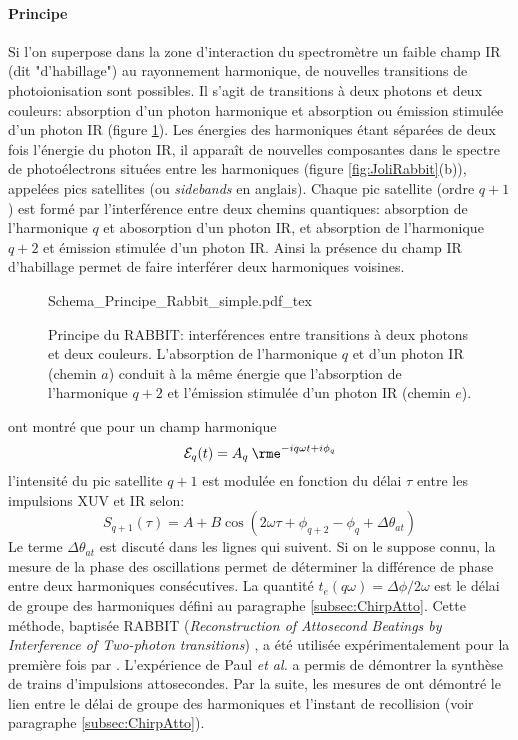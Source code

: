 \paragraph{Principe} Si l'on superpose dans la zone d'interaction du spectromètre un faible champ IR (dit "d'habillage") au rayonnement harmonique, de nouvelles transitions de photoionisation sont possibles. Il s'agit de transitions à deux photons et deux couleurs: absorption d'un photon harmonique et absorption ou émission stimulée d'un photon IR (figure \ref{fig:PrincipeRabbit2}). Les énergies des harmoniques étant séparées de deux fois l'énergie du photon IR, il apparaît de nouvelles composantes dans le spectre de photoélectrons situées entre les harmoniques (figure \ref{fig:JoliRabbit}(b)), appelées pics satellites (ou \textit{sidebands} en anglais). Chaque pic satellite (ordre $q+1$) est formé par l'interférence entre deux chemins quantiques: absorption de l'harmonique $q$ et abosorption d'un photon IR, et absorption de l'harmonique $q+2$ et émission stimulée d'un photon IR. Ainsi la présence du champ IR d'habillage permet de faire interférer deux harmoniques voisines.

\begin{figure}[ht]
\centering
\def\svgwidth{0.5\columnwidth}
{Schema_Principe_Rabbit_simple.pdf_tex}
\caption{Principe du RABBIT: interférences entre transitions à deux photons et deux couleurs. L'absorption de l'harmonique $q$ et d'un photon IR (chemin $a$) conduit à la même énergie que l'absorption de l'harmonique $q+2$ et l'émission stimulée d'un photon IR (chemin $e$).}
\label{fig:PrincipeRabbit2}
\end{figure}

  ont montré que  pour un champ harmonique
\begin{equation}
\mathcal{E}_q(t) = A_q \: \rme^{-iq\omega t + i\phi_q}
\end{equation}
l'intensité du pic satellite $q+1$ est modulée en fonction du délai $\tau$ entre les impulsions XUV et IR selon:
\begin{equation}
S_{q+1}(\tau) = A + B \cos(2\omega \tau + \phi_{q+2} - \phi_q + \Delta \theta_{at})
\label{eq:Rabbit_simple}
\end{equation}
Le terme $\Delta \theta_{at}$ est discuté dans les lignes qui suivent. Si on le suppose connu, la mesure de la phase des oscillations permet de déterminer la différence de phase entre deux harmoniques consécutives. La quantité $t_e (q\omega) = \Delta \phi / 2\omega$ est le délai de groupe des harmoniques défini au paragraphe \ref{subsec:ChirpAtto}. Cette méthode, baptisée RABBIT (\textit{Reconstruction of Attosecond Beatings by Interference of Two-photon transitions}) , a été utilisée expérimentalement pour la première fois par . L'expérience de Paul \textit{et al.} a permis de démontrer la synthèse de trains d'impulsions attosecondes. Par la suite, les mesures de  ont démontré le lien entre le délai de groupe des harmoniques et l'instant de recollision (voir paragraphe \ref{subsec:ChirpAtto}). 

